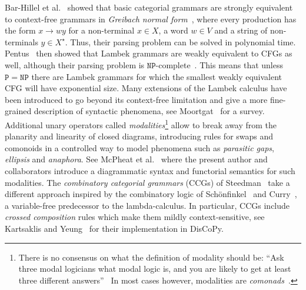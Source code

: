 Bar-Hillel et al.~\cite{Bar-HillelEtAl60} showed that basic categorial grammars are strongly equivalent to context-free grammars in \emph{Greibach normal form}~\cite{Greibach65}, where every production has the form $x \to w y$ for a non-terminal $x \in X$, a word $w \in V$ and a string of non-terminals $y \in X^\star$.
Thus, their parsing problem can be solved in polynomial time.
Pentus~\cite{Pentus93} then showed that Lambek grammars are weakly equivalent to CFGs as well, although their parsing problem is $\mathtt{NP}$-complete~\cite{Pentus06}.
This means that unless $\mathtt{P} = \mathtt{NP}$ there are Lambek grammars for which the smallest weakly equivalent CFG will have exponential size.
Many extensions of the Lambek calculus have been introduced to go beyond its context-free limitation and give a more fine-grained description of syntactic phenomena, see Moortgat~\cite{Moortgat14} for a survey.
Additional unary operators called \emph{modalities}\footnote
{There is no consensus on what the definition of modality should be: ``Ask three modal logicians what modal logic is, and you are likely to get at least three different answers''~\cite{BlackburnEtAl02}
In most cases however, modalities are \emph{comonads}~\cite{CirsteaEtAl11}.} allow to break away from the planarity and linearity of closed diagrams, introducing rules for swaps and comonoids in a controlled way to model phenomena such as \emph{parasitic gaps}, \emph{ellipsis} and \emph{anaphora}.
See McPheat et al.~\cite{McPheatEtAl21} where the present author and collaborators introduce a diagrammatic syntax and functorial semantics for such modalities.
The \emph{combinatory categorial grammars} (CCGs) of Steedman~\cite{Steedman87,Steedman00} take a different approach inspired by the combinatory logic of Schönfinkel~\cite{Schonfinkel24} and Curry~\cite{Curry30}, a variable-free predecessor to the lambda-calculus.
In particular, CCGs include \emph{crossed composition} rules which make them mildly context-sensitive, see Kartsaklis and Yeung~\cite{YeungKartsaklis21} for their implementation in DisCoPy.


